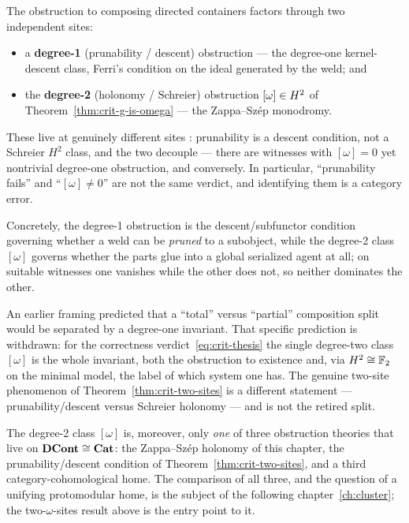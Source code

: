 \begin{theorem}
\label{thm:crit-two-sites}
The obstruction to composing directed containers factors through two independent
sites:
\begin{itemize}
\item a \textbf{degree-1} (prunability / descent) obstruction --- the
  degree-one kernel-descent class, Ferri's condition on the ideal generated by the
  weld; and
\item the \textbf{degree-2} (holonomy / Schreier) obstruction $[\omega]\in H^2$
  of Theorem~\ref{thm:crit-g-is-omega} --- the Zappa--Sz\'ep monodromy.
\end{itemize}
These live at genuinely different sites \cite{cl-descent,cl-twotier,cl-separation,ferri-qsb}:
prunability is a descent condition, not a
Schreier $H^2$ class, and the two decouple --- there are witnesses with
$[\omega]=0$ yet nontrivial degree-one obstruction, and conversely. In
particular, ``prunability fails'' and ``$[\omega]\neq0$'' are not the same
verdict, and identifying them is a category error.
\end{theorem}

Concretely, the degree-1 obstruction is the descent/subfunctor condition governing
whether a weld can be \emph{pruned} to a subobject, while the degree-2 class
$[\omega]$ governs whether the parts glue into a global serialized agent at all;
on suitable witnesses one vanishes while the other does not, so neither dominates
the other.

\begin{remark}
\label{rem:crit-retired}
An earlier framing predicted that a ``total'' versus ``partial'' composition split
would be separated by a degree-one invariant. That specific prediction is
withdrawn: for the correctness verdict~\eqref{eq:crit-thesis} the single
degree-two class $[\omega]$ is the whole invariant, both the obstruction to
existence and, via $H^2\cong\mathbb{F}_2$ on the minimal model, the label of
which system one has. The genuine two-site phenomenon of
Theorem~\ref{thm:crit-two-sites} is a different statement --- prunability/descent
versus Schreier holonomy --- and is not the retired split.
\end{remark}

The degree-2 class $[\omega]$ is, moreover, only \emph{one} of three obstruction
theories that live on $\mathbf{DCont}\cong\mathbf{Cat}$: the Zappa--Sz\'ep holonomy of this
chapter, the prunability/descent condition of
Theorem~\ref{thm:crit-two-sites}, and a third category-cohomological home. The
comparison of all three, and the question of a unifying protomodular home, is the
subject of the following chapter~\ref{ch:cluster}; the two-$\omega$-sites result
above is the entry point to it.


